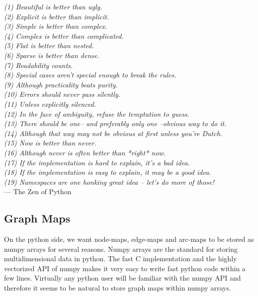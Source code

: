 \begin{flushright}{\slshape    
(1) Beautiful is better than ugly. \\ \label{cit:line_a}
(2) Explicit is better than implicit. \\ \label{cit:line_b}
(3) Simple is better than complex. \\
(4) Complex is better than complicated. \\
(5) Flat is better than nested. \\
(6) Sparse is better than dense. \\
(7) Readability counts. \\
(8) Special cases aren't special enough to break the rules. \\
(9) Although practicality beats purity. \\
(10) Errors should never pass silently. \\
(11) Unless explicitly silenced. \\
(12) In the face of ambiguity, refuse the temptation to guess. \\
(13) There should be one-- and preferably only one --obvious way to do it. \\
(14) Although that way may not be obvious at first unless you're Dutch. \\
(15) Now is better than never. \\
(16) Although never is often better than *right* now. \\
(17) If the implementation is hard to explain, it's a bad idea. \\
(18) If the implementation is easy to explain, it may be a good idea. \\
(19) Namespaces are one honking great idea -- let's do more of those! } \\ \medskip
--- The Zen of Python
\end{flushright}
\label{fig:zen_of_python}






\subsection{Graph Maps}

On the python side, we want node-maps, edge-maps and arc-maps to be stored 
as numpy arrays for several reasons.
Numpy arrays are the standard for storing multidimensional data in python.
The fast C implementation and the highly vectorized API of numpy makes it very easy to write 
fast python code within a few lines.
Virtually any python user will be familiar with the numpy API and therefore it 
seems to be natural to store graph maps within numpy arrays.

